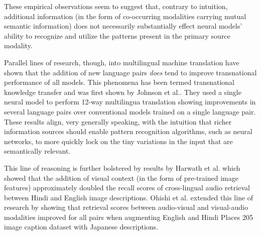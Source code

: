 These empirical observations seem to suggest that, contrary to intuition, additional information (in the form of co-occurring modalities carrying mutual semantic information) does not necessarily substantially effect neural models' ability to recognize and utilize the patterns present in the primary source modality.

Parallel lines of research, though, into multilingual machine translation have shown that the addition of new language pairs \textit{does} tend to improve transnational performance of all models. 
This phenomena has been termed transnational knowledge transfer \cite{dabre2020comprehensive} and  was first shown by Johnson et al.\cite{johnson2017google}.
They used a single neural model to perform 12-way multilingua translation showing improvements in several language pairs over conventional models trained on a single language pair.
These results align, very generally speaking, with the intuition that richer information sources should enable pattern recognition algorithms, such as neural networks, to more quickly lock on the tiny variations in the input that are semantically relevant. 

This line of reasoning is further bolstered by results by Harwath et al. \cite{harwath2018interlingua} which showed that the addition of visual context (in the form of pre-trained image features) approximately doubled the recall scores of cross-lingual audio retrieval between Hindi and English image descriptions.
Ohishi et al. \cite{ohishi2020trilingual} extended this line of research by showing that retrieval scores between audio-visual and visual-audio modalities improved for all pairs when augmenting English and Hindi Places 205 \cite{zhou2014learning} image caption dataset with Japanese descriptions.




